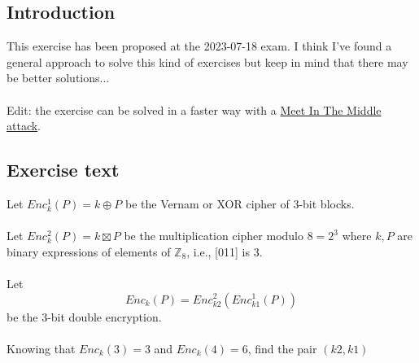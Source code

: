 \subsection{Introduction}
This exercise has been proposed at the 2023-07-18 exam. I think I've found a general approach to solve this kind of exercises but keep in mind that there may be better solutions...\\\\
Edit: the exercise can be solved in a faster way with a \textcolor{blue}{\hyperlink{link1}{Meet In The Middle attack}}.

\subsection{Exercise text}
Let $Enc_k^1(P)=k\oplus P$ be the Vernam or XOR cipher of 3-bit blocks.\\\\
Let $Enc_k^2(P)=k\boxtimes P$ be the multiplication cipher modulo $8=2^3$ where $k,P$ are binary expressions of elements of $\mathbb{Z}_8$, i.e., [011] is 3.\\\\
Let $$Enc_k(P)=Enc^2_{k2}\left(Enc_{k1}^1(P)\right)$$
be the 3-bit double encryption.\\\\
Knowing that $Enc_k(3)=3$ and $Enc_k(4)=6$, find the pair $(k2,k1)$

